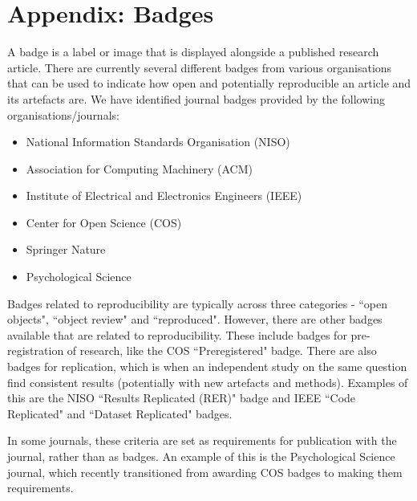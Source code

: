 \section{Appendix: Badges} \label{appendix:badges}

A badge is a label or image that is displayed alongside a published research article. There are currently several different badges from various organisations that can be used to indicate how open and potentially reproducible an article and its artefacts are. We have identified journal badges provided by the following organisations/journals:
\begin{itemize}
    \item National Information Standards Organisation (NISO)\autocite{association_for_computing_machinery_acm_artifact_2020}
    \item Association for Computing Machinery (ACM)\autocite{association_for_computing_machinery_acm_artifact_2020}
    \item Institute of Electrical and Electronics Engineers (IEEE)\autocite{institute_of_electrical_and_electronics_engineers_ieee_about_nodate}
    \item Center for Open Science (COS)\autocite{blohowiak_badges_2023}
    \item Springer Nature\autocite{springer_nature_springer_2018}
    \item Psychological Science\autocite{hardwicke_transparency_2023,association_for_psychological_science_aps_psychological_2023}
\end{itemize}

Badges related to reproducibility are typically across three categories - ``open objects", ``object review" and ``reproduced". However, there are other badges available that are related to reproducibility. These include badges for pre-registration of research, like the COS ``Preregistered" badge.\autocite{blohowiak_badges_2023} There are also badges for replication, which is when an independent study on the same question find consistent results (potentially with new artefacts and methods). Examples of this are the NISO ``Results Replicated (RER)" badge\autocite{niso_reproducibility_badging_and_definitions_working_group_reproducibility_2021} and IEEE ``Code Replicated" and ``Dataset Replicated" badges.\autocite{institute_of_electrical_and_electronics_engineers_ieee_about_nodate}

In some journals, these criteria are set as requirements for publication with the journal, rather than as badges. An example of this is the Psychological Science journal, which recently transitioned from awarding COS badges to making them requirements.\autocite{hardwicke_transparency_2023}

